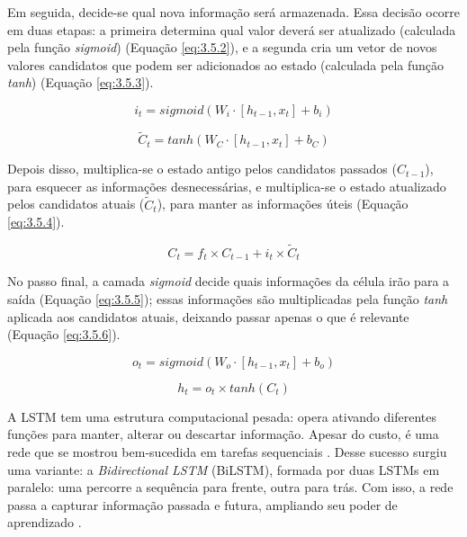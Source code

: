 Em seguida, decide-se qual nova informação será armazenada. Essa decisão ocorre em duas etapas: a primeira determina qual valor deverá ser atualizado (calculada pela função \textit{sigmoid}) (Equação \ref{eq:3.5.2}), e a segunda cria um vetor de novos valores candidatos que podem ser adicionados ao estado (calculada pela função \textit{tanh}) (Equação \ref{eq:3.5.3}).

\begin{equation}
    i_{t} = sigmoid(W_{i} \cdot [h_{t-1}, x_{t}] + b_{i})
    \label{eq:3.5.2}
\end{equation}

\begin{equation}
    \tilde{C}_{t} = tanh(W_{C} \cdot [h_{t-1}, x_{t}] + b_{C})
    \label{eq:3.5.3}
\end{equation}
 
Depois disso, multiplica-se o estado antigo pelos candidatos passados ($C_{t-1}$), para esquecer as informações desnecessárias, e multiplica-se o estado atualizado pelos candidatos atuais ($\tilde{C}_{t}$), para manter as informações úteis (Equação \ref{eq:3.5.4}).

\begin{equation}
    C_{t} = f_{t} \times C_{t-1} + i_{t} \times \tilde{C}_{t}
    \label{eq:3.5.4}
\end{equation}
 
No passo final, a camada \textit{sigmoid} decide quais informações da célula irão para a saída (Equação \ref{eq:3.5.5}); essas informações são multiplicadas pela função \textit{tanh} aplicada aos candidatos atuais, deixando passar apenas o que é relevante (Equação \ref{eq:3.5.6}).

\begin{equation}
    o_{t} = sigmoid(W_{o} \cdot [h_{t-1}, x_{t}] + b_{o})
    \label{eq:3.5.5}
\end{equation}

\begin{equation}
    h_{t} = o_{t} \times tanh(C_{t})
    \label{eq:3.5.6}
\end{equation}

A LSTM tem uma estrutura computacional pesada: opera ativando diferentes funções para manter, alterar ou descartar informação. Apesar do custo, é uma rede que se mostrou bem-sucedida em tarefas sequenciais \cite{tai2015}. Desse sucesso surgiu uma variante: a \textit{Bidirectional LSTM} (BiLSTM), formada por duas LSTMs em paralelo: uma percorre a sequência para frente, outra para trás. Com isso, a rede passa a capturar informação passada e futura, ampliando seu poder de aprendizado \cite{graves2013}.


